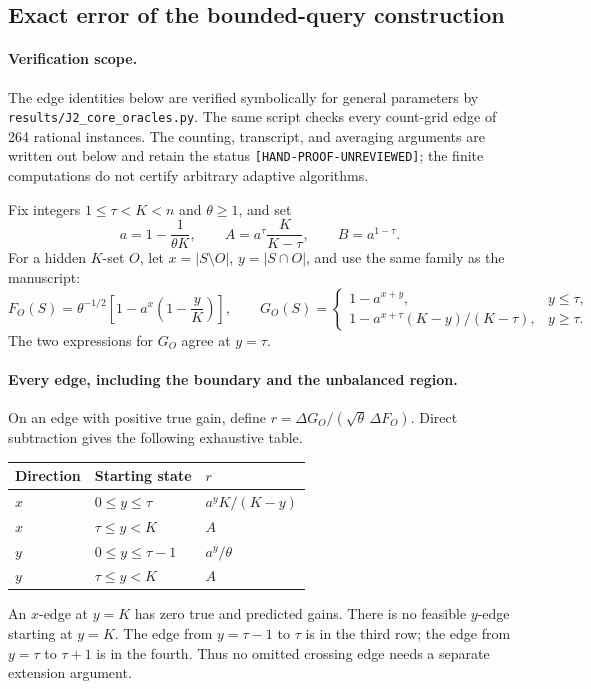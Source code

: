 
\subsection{Exact error of the bounded-query construction}
\label{app:j2-hardness-repair}

\paragraph{Verification scope.}
The edge identities below are verified symbolically for general parameters
by \texttt{results/J2\_core\_oracles.py}. The same script checks every count-grid
edge of 264 rational instances. The counting, transcript, and averaging
arguments are written out below and retain the status
\texttt{[HAND-PROOF-UNREVIEWED]}; the finite computations do not certify
arbitrary adaptive algorithms.

Fix integers $1\le\tau<K<n$ and $\theta\ge1$, and set
\[
 a=1-\frac1{\theta K},\qquad
 A=a^\tau\frac K{K-\tau},\qquad B=a^{1-\tau}.
\]
For a hidden $K$-set $O$, let $x=|S\setminus O|$, $y=|S\cap O|$, and use the
same family as the manuscript:
\[
 F_O(S)=\theta^{-1/2}\left[1-a^x\left(1-\frac yK\right)\right],\qquad
 G_O(S)=\begin{cases}
 1-a^{x+y},&y\le\tau,\\
 1-a^{x+\tau}(K-y)/(K-\tau),&y\ge\tau.
 \end{cases}
\]
The two expressions for $G_O$ agree at $y=\tau$.

\paragraph{Every edge, including the boundary and the unbalanced region.}
On an edge with positive true gain, define
$r=\Delta G_O/(\sqrt\theta\,\Delta F_O)$. Direct subtraction gives the
following exhaustive table.
\begin{center}
\begin{tabular}{lll}
\toprule
Direction & Starting state & $r$ \\
\midrule
$x$ & $0\le y\le\tau$ & $a^yK/(K-y)$ \\
$x$ & $\tau\le y<K$ & $A$ \\
$y$ & $0\le y\le\tau-1$ & $a^y/\theta$ \\
$y$ & $\tau\le y<K$ & $A$ \\
\bottomrule
\end{tabular}
\end{center}
An $x$-edge at $y=K$ has zero true and predicted gains. There is no feasible
$y$-edge starting at $y=K$. The edge from $y=\tau-1$ to $\tau$ is in the third
row; the edge from $y=\tau$ to $\tau+1$ is in the fourth. Thus no omitted
crossing edge needs a separate extension argument.

